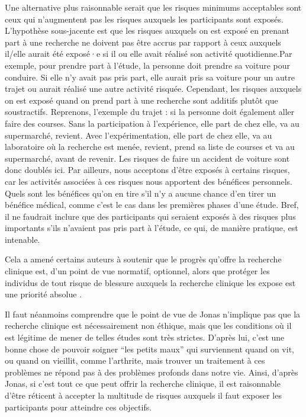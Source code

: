 \documentclass[
  12pt,
]{book}
\begin{document}
Une alternative plus raisonnable serait que les risques minimums acceptables sont ceux qui n'augmentent pas les risques auxquels les participants sont exposés. L'hypothèse sous-jacente est que les risques auxquels on est exposé en prenant part à une recherche ne doivent pas être accrus par rapport à ceux auxquels il/elle aurait été exposé·e si il ou elle avait réalisé son activité quotidienne.Par exemple, pour prendre part à l'étude, la personne doit prendre sa voiture pour conduire. Si elle n'y avait pas pris part, elle aurait pris sa voiture pour un autre trajet ou aurait réalisé une autre activité risquée. Cependant, les risques auxquels on est exposé quand on prend part à une recherche sont additifs plutôt que soustractifs. Reprenons, l'exemple du trajet : si la personne doit également aller faire des courses. Sans la participation à l'expérience, elle part de chez elle, va au supermarché, revient. Avec l'expérimentation, elle part de chez elle, va au laboratoire où la recherche est menée, revient, prend sa liste de courses et va au supermarché, avant de revenir. Les risques de faire un accident de voiture sont donc doublés ici. Par ailleurs, nous acceptons d'être exposés à certains risques, car les activités associées à ces risques nous apportent des bénéfices personnels. Quels sont les bénéfices qu'on en tire s'il n'y a aucune chance d'en tirer un bénéfice médical, comme c'est le cas dans les premières phases d'une étude. Bref, il ne faudrait inclure que des participants qui seraient exposés à des risques plus importants s'ils n'avaient pas pris part à l'étude, ce qui, de manière pratique, est intenable.

Cela a amené certains auteurs à soutenir que le progrès qu'offre la recherche clinique est, d'un point de vue normatif, optionnel, alors que protéger les individus de tout risque de blessure auxquels la recherche clinique les expose est une priorité absolue \citep{Jonas1976}.

Il faut néanmoins comprendre que le point de vue de Jonas n'implique pas que la recherche clinique est nécessairement non éthique, mais que les conditions où il est légitime de mener de telles études sont très strictes. D'après lui, c'est une bonne chose de pouvoir soigner ``les petits maux'' qui surviennent quand on vit, ou quand on vieillit, comme l'arthrite, mais trouver un traitement à ces problèmes ne répond pas à des problèmes profonds dans notre vie. Ainsi, d'après Jonas, si c'est tout ce que peut offrir la recherche clinique, il est raisonnable d'être réticent à accepter la multitude de risques auxquels il faut exposer les participants pour atteindre ces objectifs.
\end{document}
